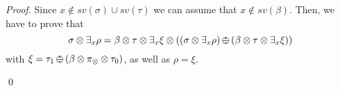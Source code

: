 \documentclass{llncs}
\newcommand{\comment}[1]{}
\def\monid{{\mathbf 0}}
\def\odiv{\, {\ominus\hspace{-7.7pt} \div} \,}
\def\monid{\mathbf{1}}
\begin{document}
\begin{proof}
Since  $x \not \in sv(\sigma) \cup sv(\tau)$ we can assume that $x \not \in sv(\beta)$. Then, we have to prove that 
$$\sigma \otimes \exists_x \rho = \beta \otimes \tau \otimes \exists_x \xi \otimes ((\sigma \otimes \exists_x \rho) \odiv (\beta \otimes \tau \otimes \exists_x \xi))$$
with $\xi = \tau_1 \odiv (\beta \otimes \pi_\otimes \otimes \tau_0)$, as well as $\rho = \xi$.
%
\comment{
\noindent
Now, if $\beta = \monid$ by Theorem~\ref{sound}
and Lemma~\ref{riminor}
we have $\sigma_1 =  \tau_1 \otimes 
((\bigotimes \pi \otimes \sigma_0) \odiv (\bigotimes \pi \otimes \tau_0))$
and by induction hypothesis
$$\langle \exists^\pi_x A, \tau \rangle \xrightarrow{\monid}
  \langle \exists^{\pi \mu}_x B, \tau \otimes \exists_x \mu \rangle$$
with $\mu = \tau_1 \odiv (\bigotimes \pi \otimes \tau_0)$, and we have to prove that
$\sigma = \tau \otimes \sigma''$ and $\sigma \otimes \exists_x \rho = \tau \otimes  \exists_x \mu \otimes \sigma''$
for some $\sigma''$.

Let us choose $\alpha = \sigma \odiv \tau$, noting that 
$x \not \in sv(\alpha)$ by Remark~\ref{remdiv}
and that $\alpha \odiv \beta$ is a witness for $\sigma_2$, since
$$\bigotimes \pi \otimes \tau_0 \otimes \beta \otimes (\alpha \odiv \beta) = 
(\bigotimes \pi \odiv \exists_x \pi)  \otimes  \exists_x \pi \otimes \tau_0 \otimes \alpha =
(\bigotimes \pi \odiv \exists_x \pi) \otimes \sigma$$
$$\sigma_1 = \tau_1 \otimes (\alpha \odiv \beta) ?????$$
%
By Lemma~\ref{riminor} we have that
$$\langle A, \bigotimes \pi \otimes \tau_0 \rangle  \xrightarrow{\alpha}
  \langle B, \tau_1 \otimes (\alpha \odiv \beta) \rangle$$
which implies
  $$\langle \exists^\pi_x A, \tau \rangle  \xrightarrow{\alpha}
  \langle \exists^{\pi \mu}_x B, \alpha \otimes \tau \otimes \exists_x \mu \rangle$$
with $\mu = (\tau_1 \otimes (\alpha \odiv \beta)) \odiv (\alpha \otimes \bigotimes \pi  \otimes \tau_0)$.

\noindent
We must prove that $\sigma = \tau \otimes \alpha \otimes \sigma''$ and 
$\sigma \otimes \exists_x \rho = \alpha \otimes \tau \otimes \exists_x \mu \otimes \sigma''$ for some $\sigma''$.
Since $\alpha = \sigma \odiv \tau$, a possible solution would be $\sigma'' = \monid$,
as long as $\rho = \mu$,
and the latter holds since
$$\rho = \sigma_1 \odiv (\bigotimes \pi  \otimes \sigma_0) = \tau_1 \otimes \sigma_2 \odiv ((\bigotimes \pi  \odiv \exists_x \pi) \otimes \sigma)$$
$$\mu = (\tau_1 \otimes (\alpha \odiv \beta)) \odiv (\alpha \otimes \bigotimes \pi  \otimes \tau_0) = 
(\tau_1 \otimes (\alpha \odiv \beta)) \odiv ((\sigma \odiv \tau) \otimes (\bigotimes \pi  \odiv \exists_x \pi)  \otimes \tau)$$
}
\qed
\end{proof}
\end{document}
